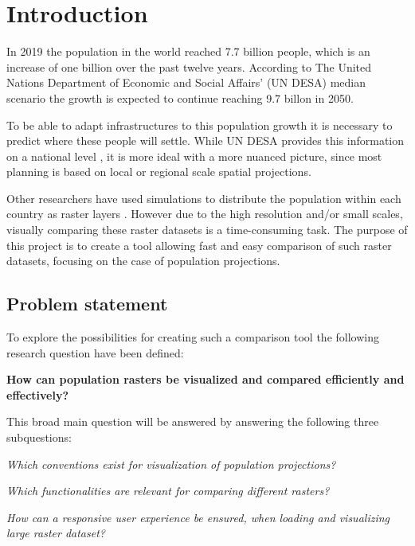 \chapter{Introduction}
In 2019 the population in the world reached 7.7 billion people, which is an increase of one billion over the past twelve years. According to The United Nations Department of Economic and Social Affairs’ (UN DESA) median scenario the growth is expected to continue reaching 9.7 billon in 2050. \citep{UNDEASHightlights} 

To be able to adapt infrastructures to this population growth it is necessary to predict where these people will settle. While UN DESA provides this information on a national level \citep{NationalPop}, it is more ideal with a more nuanced picture, since most planning is based on local or regional scale spatial projections. \citep{WhyDetailedPop}

Other researchers have used simulations to distribute the population within each country as raster layers \citep{Kessler}. However due to the high resolution and/or small scales, visually comparing these raster datasets is a time-consuming task. The purpose of this project is to create a tool allowing fast and easy comparison of such raster datasets, focusing on the case of population projections.


\section{Problem statement}

To explore the possibilities for creating such a comparison tool the following research question have been defined:

\textbf{How can population rasters be visualized and compared efficiently and effectively?}

This broad main question will be answered by answering the following three subquestions:

\textit{Which conventions exist for visualization of population projections?}

\textit{Which functionalities are relevant for comparing different rasters?}

\textit{How can a responsive user experience be ensured, when loading and visualizing large raster dataset?}


